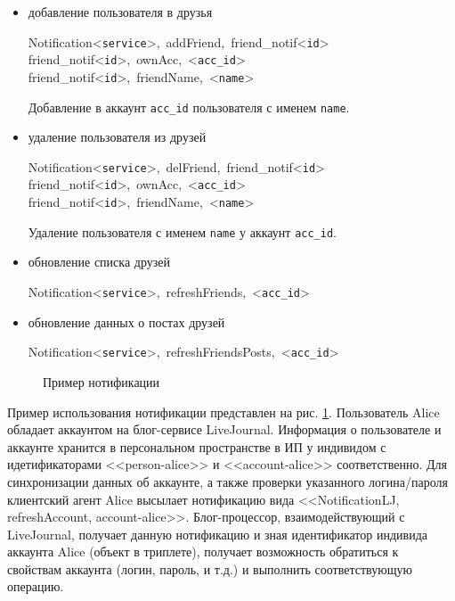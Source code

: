 \begin{itemize}
\item
добавление пользователя в друзья

\mbox{Notification<{\tt service}>, addFriend, friend\_notif<{\tt id}>}\\
\mbox{friend\_notif<{\tt id}>, ownAcc, <{\tt acc\_id}>}\\
\mbox{friend\_notif<{\tt id}>, friendName, <{\tt name}>}

Добавление в аккаунт {\tt acc\_id} пользователя с именем {\tt name}.

\item
удаление пользователя из друзей

\mbox{Notification<{\tt service}>, delFriend, friend\_notif<{\tt id}>}\\
\mbox{friend\_notif<{\tt id}>, ownAcc, <{\tt acc\_id}>}\\
\mbox{friend\_notif<{\tt id}>, friendName, <{\tt name}>}

Удаление пользователя с именем {\tt name} у аккаунт {\tt acc\_id}.

\item
обновление списка друзей

\mbox{Notification<{\tt service}>, refreshFriends, <{\tt acc\_id}>}

\item
обновление данных о постах друзей

\mbox{Notification<{\tt service}>, refreshFriendsPosts, <{\tt acc\_id}>}

\end{itemize}

\begin{figure}[h]
\centerline{
}
\caption{Пример нотификации}
\label{notification-example}
\end{figure}

Пример использования нотификации представлен на рис. \ref{notification-example}.
Пользователь Alice обладает аккаунтом на блог-сервисе LiveJournal. Информация о пользователе и аккаунте хранится в персональном пространстве в ИП у индивидом с идетификаторами <<person-alice>> и <<account-alice>> соответственно. Для синхронизации данных об аккаунте, а также проверки указанного логина/пароля клиентский агент Alice высылает нотификацию вида <<NotificationLJ, refreshAccount, account-alice>>. Блог-процессор, взаимодействующий с LiveJournal, получает данную нотификацию и зная идентификатор индивида аккаунта Alice (объект в триплете), получает возможность обратиться к свойствам аккаунта (логин, пароль, и т.д.) и выполнить соответствующую операцию.

